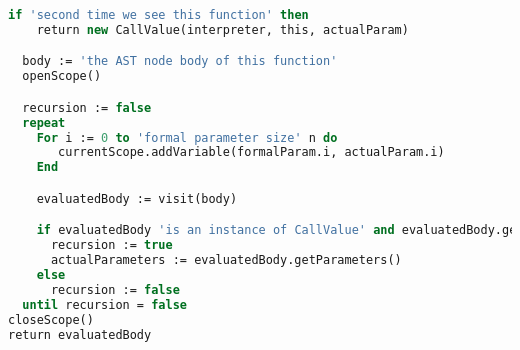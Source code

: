 \begin{lstlisting}[language=Pascal,label=alg:tailrecursion, caption={Detecting tail recursion during call of a function.}]
  if 'second time we see this function' then
    return new CallValue(interpreter, this, actualParam)

  body := 'the AST node body of this function'
  openScope()

  recursion := false
  repeat
    For i := 0 to 'formal parameter size' n do
       currentScope.addVariable(formalParam.i, actualParam.i)
    End

    evaluatedBody := visit(body)

    if evaluatedBody 'is an instance of CallValue' and evaluatedBody.getFunction() = this then
      recursion := true
      actualParameters := evaluatedBody.getParameters()
    else
      recursion := false
  until recursion = false 
closeScope()
return evaluatedBody
\end{lstlisting}

%
%  
%  
